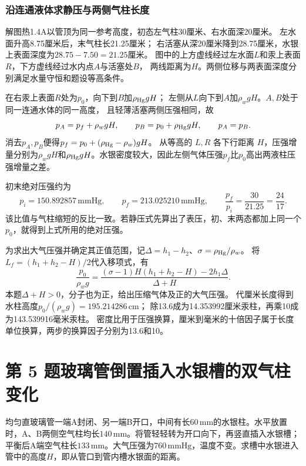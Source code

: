 \documentclass[UTF8,fontset=fandol,a4paper,11pt]{ctexart}
\begin{document}
\subsubsection*{沿连通液体求静压与两侧气柱长度}
解图热1.4A以管顶为同一参考高度，初态左气柱30厘米、右水面深20厘米。
左水面升高8.75厘米后，末气柱长21.25厘米；
右活塞从深20厘米降到28.75厘米，水银上表面深度为$28.75-7.50=21.25$厘米。
图中的上方虚线经过左水面$L$和汞上表面$R$，下方虚线经过水内点$A$与活塞处$B$，
两线距离为$H$。两侧位移与两表面深度分别满足水量守恒和题设等高条件。

在右汞上表面$R$处为$p_0$，向下到$B$加$\rho_{\rm Hg}gH$；
左侧从$L$向下到$A$加$\rho_wgH$。$A,B$处于同一连通水体的同一高度，
且轻薄活塞两侧压强相同，故
\[
p_A=p_f+\rho_wgH,\qquad
p_B=p_0+\rho_{\rm Hg}gH,\qquad p_A=p_B.
\]
消去$p_A,p_B$便得$p_f=p_0+(\rho_{\rm Hg}-\rho_w)gH$。
从等高的 $L,R$ 各下行距离 $H$，压强增量分别为$\rho_wgH$和$\rho_{\rm Hg}gH$。水银密度较大，因此左侧气体压强$p_f$比$p_0$高出两液柱压强增量之差。

初末绝对压强约为
\[
p_i=150.892857\,\mathrm{mmHg},\qquad
p_f=213.025210\,\mathrm{mmHg},\qquad
\frac{p_f}{p_i}=\frac{30}{21.25}=\frac{24}{17}.
\]
该比值与气柱缩短的反比一致。若静压式先算出了表压，初、末两态都加上同一个 $p_0$，就得到上式所用的绝对压强。

为求出大气压强并确定其正值范围，记$\Delta=h_1-h_2$、$\sigma=\rho_{\rm Hg}/\rho_w$。
将$L_f=(h_1+h_2-H)/2$代入移项式，有
\[
\frac{p_0}{\rho_wg}
=\frac{(\sigma-1)H(h_1+h_2-H)-2h_1\Delta}{\Delta+H}.
\]
本题$\Delta+H>0$，分子也为正，给出压缩气体及正的大气压强。
代厘米长度得到水柱高度$p_0/(\rho_wg)=195.214286\,\mathrm{cm}$；
除13.6成为14.353992厘米汞柱，再乘10成为143.539916毫米汞柱。
密度比用于压强换算，厘米到毫米的十倍因子属于长度单位换算，两步的换算因子分别为13.6和10。




\section*{第 5 题\quad 玻璃管倒置插入水银槽的双气柱变化}

均匀直玻璃管一端A封闭、另一端B开口，中间有长$60\,\mathrm{mm}$的水银柱。水平放置时，A、B两侧空气柱均长$140\,\mathrm{mm}$。将管轻轻转为开口向下，再竖直插入水银槽；平衡后A端空气柱长$133\,\mathrm{mm}$。大气压强为$760\,\mathrm{mmHg}$，温度不变。求槽中水银进入管中的高度$H$，即从管口到管内槽水银面的距离。
\end{document}
